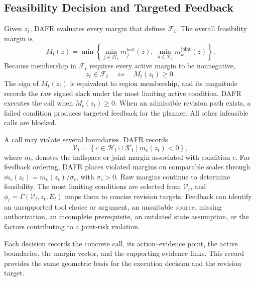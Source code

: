 \documentclass[letterpaper]{article}
\begin{document}
\subsection{Feasibility Decision and Targeted Feedback}

Given $z_t$, DAFR evaluates every margin that defines $\mathcal F_t$. The overall feasibility margin is
\begin{equation}
 M_t(z)=\min\left\{\min_{j\in\mathcal H_t}m_j^{\mathrm{half}}(z),\;\min_{k\in\mathcal K_t}m_k^{\mathrm{joint}}(z)\right\}.
 \label{eq:overall-margin}
\end{equation}
Because membership in $\mathcal F_t$ requires every active margin to be nonnegative,
\begin{equation}
 z_t\in\mathcal F_t\quad\Longleftrightarrow\quad M_t(z_t)\geq0.
 \label{eq:membership}
\end{equation}
The sign of $M_t(z_t)$ is equivalent to region membership, and its magnitude records the raw signed slack under the most limiting active condition. DAFR executes the call when $M_t(z_t)\geq0$. When an admissible revision path exists, a failed condition produces targeted feedback for the planner. All other infeasible calls are blocked.

A call may violate several boundaries. DAFR records
\begin{equation}
 \mathcal V_t=\left\{c\in\mathcal H_t\cup\mathcal K_t\mid m_c(z_t)<0\right\},
 \label{eq:violated-set}
\end{equation}
where $m_c$ denotes the halfspace or joint margin associated with condition $c$. For feedback ordering, DAFR places violated margins on comparable scales through $\overline m_c(z_t)=m_c(z_t)/\sigma_c$, with $\sigma_c>0$. Raw margins continue to determine feasibility. The most limiting conditions are selected from $\mathcal V_t$, and $\phi_t=\Gamma(\mathcal V_t,z_t,E_t)$ maps them to concise revision targets. Feedback can identify an unsupported tool choice or argument, an unsuitable source, missing authorization, an incomplete prerequisite, an outdated state assumption, or the factors contributing to a joint-risk violation.

Each decision records the concrete call, its action--evidence point, the active boundaries, the margin vector, and the supporting evidence links. This record provides the same geometric basis for the execution decision and the revision target.
\end{document}
